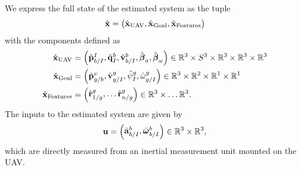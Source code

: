 We express the full state of the estimated system as the tuple
\begin{equation}
  \hat{\boldsymbol{\mathrm{x}}} =
  \begin{pmatrix}
    \hat{\boldsymbol{\mathrm{x}}}_{\text{UAV}}, \hat{\boldsymbol{\mathrm{x}}}_{\text{Goal}}, \hat{\boldsymbol{\mathrm{x}}}_{\text{Features}}
  \end{pmatrix}
\end{equation}
with the components defined as
\begin{align}
  \hat{\boldsymbol{\mathrm{x}}}_{\text{UAV}} &=
  \begin{pmatrix}
    \hat{\boldsymbol{\mathrm{p}}}_{b/I}^{I}, \hat{\boldsymbol{\mathrm{q}}}_I^{b}, \hat{\boldsymbol{\mathrm{v}}}_{b/I}^b,
    \hat{\boldsymbol{\mathrm{\beta}}}_a,
    \hat{\boldsymbol{\mathrm{\beta}}}_{\omega}
  \end{pmatrix}
    \in \mathbb{R}^3 \times S^3 \times \mathbb{R}^3 \times \mathbb{R}^3 \times
    \mathbb{R}^3  \\
    \hat{\boldsymbol{\mathrm{x}}}_{\text{Goal}} & =
    \begin{pmatrix}
      \hat{\boldsymbol{\mathrm{p}}}_{g/b}^{v}, \hat{\boldsymbol{\mathrm{v}}}_{g/I}^{g}, \hat{\psi}_{I}^{g},
      \hat{\omega}_{g/I}^{g}
    \end{pmatrix}
    \in \mathbb{R}^3 \times \mathbb{R}^2 \times \mathbb{R}^1 \times \mathbb{R}^1
    \\
    \hat{\boldsymbol{\mathrm{x}}}_{\text{Features}} & =
    \begin{pmatrix}
      \hat{\boldsymbol{\mathrm{r}}}_{1/g}^{g}, \dots \hat{\boldsymbol{\mathrm{r}}}_{n/g}^{g}
    \end{pmatrix}
    \in \mathbb{R}^3 \times \dots \mathbb{R}^3.
\end{align}
The inputs to the estimated system are given by
\begin{equation}
  \boldsymbol{\mathrm{u}} = \begin{pmatrix} \bar{\boldsymbol{\mathrm{a}}}_{b/I}^b, \bar{\boldsymbol{\mathrm{\omega}}}_{b/I}^b \end{pmatrix} \in
        \mathbb{R}^3 \times \mathbb{R}^3,
\end{equation}
which are directly measured from an inertial measurement unit mounted on the UAV.


